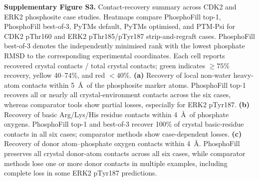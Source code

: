 \caption*{\textbf{Supplementary Figure S3.} Contact-recovery summary across CDK2 and ERK2 phosphosite case studies. Heatmaps compare PhosphoFill top-1, PhosphoFill best-of-3, PyTMs default, PyTMs optimised, and PTM-Psi for CDK2 pThr160 and ERK2 pThr185/pTyr187 strip-and-regraft cases. PhosphoFill best-of-3 denotes the independently minimised rank with the lowest phosphate RMSD to the corresponding experimental coordinates. Each cell reports recovered crystal contacts / total crystal contacts; green indicates $\geq75\%$ recovery, yellow 40--74\%, and red $<40\%$. \textbf{(a)} Recovery of local non-water heavy-atom contacts within 5~\AA\ of the phosphosite marker atoms. PhosphoFill top-1 recovers all or nearly all crystal-environment contacts across the six cases, whereas comparator tools show partial losses, especially for ERK2 pTyr187. \textbf{(b)} Recovery of basic Arg/Lys/His residue contacts within 4~\AA\ of phosphate oxygens. PhosphoFill top-1 and best-of-3 recover 100\% of crystal basic-residue contacts in all six cases; comparator methods show case-dependent losses. \textbf{(c)} Recovery of donor atom--phosphate oxygen contacts within 4~\AA. PhosphoFill preserves all crystal donor-atom contacts across all six cases, while comparator methods lose one or more donor contacts in multiple examples, including complete loss in some ERK2 pTyr187 predictions.}

